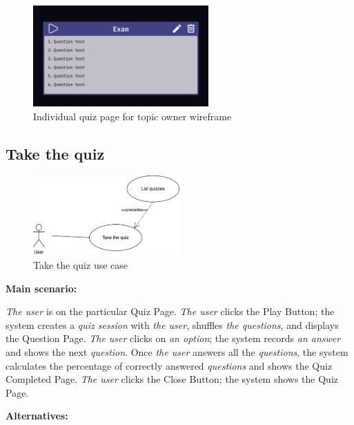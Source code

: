 \documentclass[
    english, %
]{VUMIFPSkursinis}
\begin{document}
\pagebreak

\begin{figure}[ht]
    \centering
    \includegraphics[width=0.6\textwidth]{../lab3diags/Individual quiz.png}
    \caption{Individual quiz page for topic owner wireframe}
    \label{wireframe-quiz-page-topic-owner}
\end{figure}

\subsection{Take the quiz}

\begin{figure}[ht]
    \centering
    \includegraphics[width=0.5\textwidth]{../lab3diags/take-quiz.drawio.png}
    \caption{Take the quiz use case}
    \label{take-quiz}
\end{figure}

\noindent\textbf{\fontsize{13}{15}\selectfont Main scenario:}

\textit{The user} is on the particular Quiz Page. \textit{The user} clicks the Play Button; the system creates a \textit{quiz session} with \textit{the user}, shuffles \textit{the questions}, and displays the Question Page. \textit{The user} clicks on \textit{an option}; the system records \textit{an answer} and shows the next \textit{question}. Once \textit{the user} answers all the \textit{questions}, the system calculates the percentage of correctly answered \textit{questions} and shows the Quiz Completed Page. \textit{The user} clicks the Close Button; the system shows the Quiz Page.

\noindent\textbf{\fontsize{13}{15}\selectfont Alternatives:}
\end{document}

